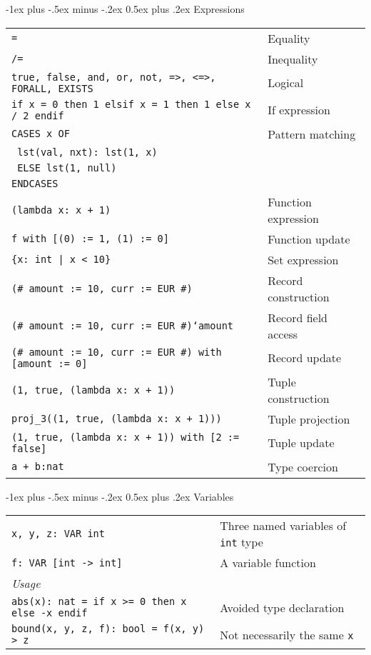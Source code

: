 \documentclass[10pt,landscape]{article}
\makeatletter
\renewcommand{\section}{\@startsection{section}{1}{0mm}%
	{-1ex plus -.5ex minus -.2ex}%
	{0.5ex plus .2ex}%
	{\normalfont\large\bfseries}}
\makeatother
\begin{document}
\begin{multicols}{2}
\section{Expressions}
\begin{tabular}{@{}ll@{}}
	\texttt{=} & Equality \\
	\texttt{/=} & Inequality \\
	\texttt{true, false, and, or, not, =>, <=>, FORALL, EXISTS} & Logical \\
	\texttt{if x = 0 then 1 elsif x = 1 then 1 else x / 2 endif} & If expression \\
	\texttt{CASES x OF} & Pattern matching\\
	\texttt{    lst(val, nxt): lst(1, x)} &\\
	\texttt{    ELSE lst(1, null)} &\\
	\texttt{ENDCASES} &\\
	\texttt{(lambda x: x + 1)} & Function expression\\
	\texttt{f with [(0) := 1, (1) := 0]} & Function update\\
	\texttt{\{x: int | x < 10\}} & Set expression \\ 
	\texttt{(\# amount := 10, curr := EUR \#)} & Record construction \\
	\texttt{(\# amount := 10, curr := EUR \#)`amount} & Record field access\\
	\texttt{(\# amount := 10, curr := EUR \#) with [amount := 0]} & Record update\\
	\texttt{(1, true, (lambda x: x + 1))} & Tuple construction\\
	\texttt{proj\_3((1, true, (lambda x: x + 1)))} & Tuple projection\\
	\texttt{(1, true, (lambda x: x + 1)) with [2 := false]} & Tuple update\\
	\texttt{a + b:nat} & Type coercion\\
\end{tabular}

\section{Variables}
\begin{tabular}{@{}ll@{}}
	\texttt{x, y, z: VAR int} & Three named variables of \texttt{int} type \\
	\texttt{f: VAR [int -> int]} & A variable function \\
	\emph{Usage} & \\
	\texttt{abs(x): nat = if x >= 0 then x else -x endif} & Avoided type declaration \\
	\texttt{bound(x, y, z, f): bool = f(x, y) > z} & Not necessarily the same \texttt{x} \\
\end{tabular}


\end{multicols}
\end{document}
